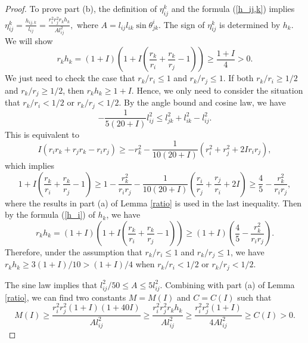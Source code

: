 \documentclass[10pt,a4paper]{amsart}
\begin{document}
\begin{proof}
	To prove part (b), the definition of $\eta_{ij}^k$ and the formula (\ref{h_ij,k}) implies
	$\eta_{ij}^k = \frac{h_{ij,k}}{l_{ij}} = \frac{r_i^2r_j^2r_kh_k}{Al^2_{ij}},$
	where $A=l_{ij}l_{ik}\sin \theta^i_{jk}$. The sign of $\eta_{ij}^k$ is determined by $h_k$. We will show
	\begin{equation}
	\label{radius}
	    	r_kh_k = (1+I)(1 + I(\frac{r_k}{r_i} +\frac{r_k}{r_j} - 1))\geq \frac{1+I}{4}>0.
	\end{equation}
	We just need to check the case that $r_k/r_i\leq 1$ and $r_k/r_j\leq 1$.  If both $r_k/r_i\geq 1/2$ and $r_k/r_j\geq 1/2$, then $r_kh_k\geq 1+I$. Hence, we only need to consider the situation that  $r_k/r_i<1/2$ or $r_k/r_j<1/2$. By the angle bound and cosine law, we have
	$$-\frac{1}{5(20+I)}l_{ij}^2 \leq l_{jk}^2 + l_{ik}^2 -l_{ij}^2 .$$
	This is equivalent to
		$$I(r_ir_k + r_jr_k - r_ir_j ) \geq - r_k^2 - \frac{1}{10(20+I)}(r_i^2 + r_j^2 + 2Ir_ir_j),$$
which implies
	 $$1 + I(\frac{r_k}{r_i} +\frac{r_k}{r_j} - 1) \geq 1 - \frac{r_k^2}{r_ir_j} - \frac{1}{10(20+I)}(\frac{r_i}{r_j} + \frac{r_j}{r_i} + 2I) \geq \frac{4}{5} - \frac{r_k^2}{r_ir_j},$$
where the results in part (a) of Lemma \ref{ratio} is used in the last inequality.
	Then by the formula (\ref{h_i}) of $h_k$, we have
	$$r_kh_k = (1+I)(1 + I(\frac{r_k}{r_i} +\frac{r_k}{r_j} - 1)) \geq (1+I)(\frac{4}{5} - \frac{r_k^2}{r_ir_j}).$$
	 Therefore, under the assumption that $r_k/r_i\leq 1$ and $r_k/r_j\leq 1$, we have $r_kh_k\geq 3(1+I)/10> (1+I)/4$ when  $r_k/r_i<1/2$ or $r_k/r_j<1/2$.

	The sine law implies that $l_{ij}^2/50\leq A\leq 5l_{ij}^2$. Combining with part (a) of Lemma \ref{ratio}, we can find two constants $M=M(I)$ and $C=C(I)$ such that
	$$M(I) \geq \frac{r_i^2r_j^2 (1+I)(1+40I)}{Al^2_{ij}}\geq \frac{r_i^2r_j^2r_kh_k}{Al^2_{ij}}\geq \frac{r_i^2r_j^2 (1+I)}{4Al^2_{ij}} \geq C(I) > 0.$$ \end{proof}
\end{document}
